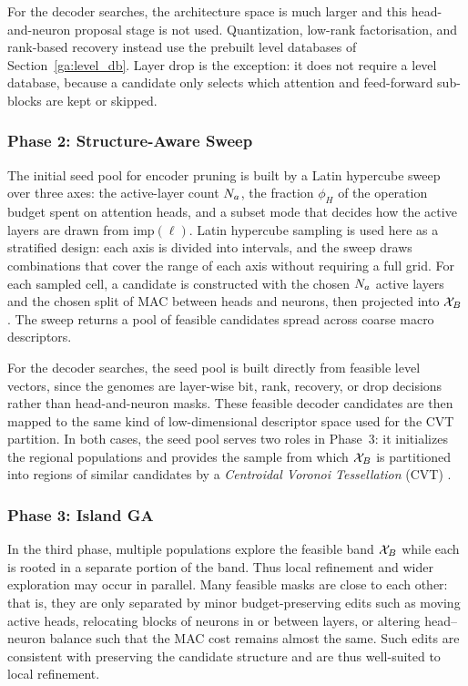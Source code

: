 For the decoder searches, the architecture space is much larger and this head-and-neuron proposal stage is not used. Quantization, low-rank factorisation, and rank-based recovery instead use the prebuilt level databases of Section~\ref{ga:level_db}. Layer drop is the exception: it does not require a level database, because a candidate only selects which attention and feed-forward sub-blocks are kept or skipped.

\subsubsection{Phase 2: Structure-Aware Sweep}
\label{ga:phase_sweep}

The initial seed pool for encoder pruning is built by a Latin hypercube sweep \citep{mckay1979comparison} over three axes: the active-layer count $N_a$, the fraction $\phi_H$ of the operation budget spent on attention heads, and a subset mode that decides how the active layers are drawn from $\mathrm{imp}(\ell)$. Latin hypercube sampling is used here as a stratified design: each axis is divided into intervals, and the sweep draws combinations that cover the range of each axis without requiring a full grid. For each sampled cell, a candidate is constructed with the chosen $N_a$ active layers and the chosen split of MAC between heads and neurons, then projected into $\mathcal{X}_B$. The sweep returns a pool of feasible candidates spread across coarse macro descriptors.

For the decoder searches, the seed pool is built directly from feasible level vectors, since the genomes are layer-wise bit, rank, recovery, or drop decisions rather than head-and-neuron masks. These feasible decoder candidates are then mapped to the same kind of low-dimensional descriptor space used for the CVT partition. In both cases, the seed pool serves two roles in Phase~3: it initializes the regional populations and provides the sample from which $\mathcal{X}_B$ is partitioned into regions of similar candidates by a \emph{Centroidal Voronoi Tessellation} (CVT) \citep[see Appendix~\ref{sec:appendix_cvt}]{du1999centroidal}.

\subsubsection{Phase 3: Island GA}
\label{ga:phase_island}
\label{chap:islands}
\label{chap:operators}
\label{ga:projection}

In the third phase, multiple populations explore the feasible band $\mathcal{X}_B$ while each is rooted in a separate portion of the band. Thus local refinement and wider exploration may occur in parallel. Many feasible masks are close to each other: that is, they are only separated by minor budget-preserving edits such as moving active heads, relocating blocks of neurons in or between layers, or altering head--neuron balance such that the MAC cost remains almost the same. Such edits are consistent with preserving the candidate structure and are thus well-suited to local refinement.

